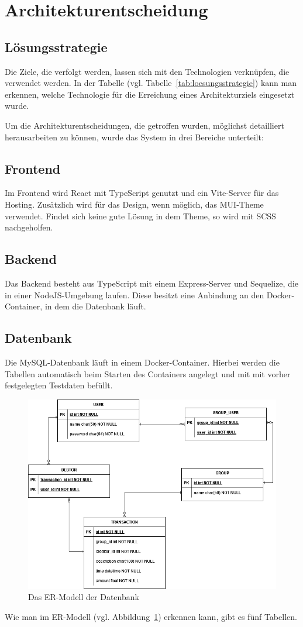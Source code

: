 \documentclass[conference]{IEEEtran}
\begin{document}
\section{Architekturentscheidung}
\subsection{Lösungsstrategie}
Die Ziele, die verfolgt werden, lassen sich mit den Technologien verknüpfen, die verwendet werden.
In der Tabelle (vgl. Tabelle~\ref{tab:loesungsstrategie}) kann man erkennen, welche Technologie für die Erreichung eines Architekturziels eingesetzt wurde.

Um die Architekturentscheidungen, die getroffen wurden, möglichst detailliert herausarbeiten zu können, wurde
das System in drei Bereiche unterteilt:
\subsection{Frontend}
Im \gls{Frontend} wird \gls{React} mit \gls{TypeScript} genutzt und ein \gls{Vite}-Server für das Hosting. Zusätzlich wird für das Design, wenn möglich, das \gls{MUI}-Theme verwendet.
Findet sich keine gute Lösung in dem Theme, so wird mit \gls{SCSS} nachgeholfen.
\subsection{Backend}
Das \gls{Backend} besteht aus TypeScript mit einem \gls{Express}-Server und \gls{Sequelize}, die in einer \gls{NodeJS}-Umgebung laufen.
Diese besitzt eine Anbindung an den \gls{Docker}-Container, in dem die Datenbank läuft.
\subsection{Datenbank}
Die \gls{MySQL}-Datenbank läuft in einem Docker-Container. Hierbei werden die Tabellen automatisch beim Starten des Containers angelegt und mit mit vorher festgelegten Testdaten befüllt.
\begin{figure}[h]
    \centering
    \includegraphics[width=\linewidth]{ER_Modell.png}
    \caption[Das ER-Modell der Datenbank]
    {Das ER-Modell der Datenbank}
    \label{fig:erModell}
\end{figure}
Wie man im \gls{ER-Modell} (vgl. Abbildung~\ref{fig:erModell}) erkennen kann, gibt es fünf Tabellen.
\end{document}
